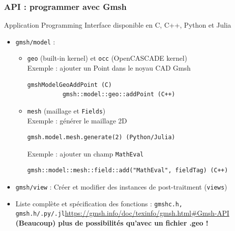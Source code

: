 \documentclass[aspectratio=169]{beamer}
\begin{document}

\begin{frame}[fragile]
\frametitle{API : programmer avec Gmsh}
  Application Programming Interface disponible en C, C++, Python et Julia \\
  \begin{itemize}
    \item \texttt{gmsh/model} :
    \begin{itemize}
      \item \texttt{geo} (built-in kernel) et \texttt{occ} (OpenCASCADE kernel)\\
       Exemple : ajouter un Point dans le noyau CAD Gmsh
        \begin{lstlisting}[frame=none, aboveskip=0mm, belowskip=0mm]
          gmshModelGeoAddPoint (C)
          gmsh::model::geo::addPoint (C++)
        \end{lstlisting}
      \item \texttt{mesh} (maillage et \texttt{Fields})\\
        Exemple : générer le maillage 2D
        \begin{lstlisting}[frame=none, aboveskip=0mm, belowskip=0mm]
          gmsh.model.mesh.generate(2) (Python/Julia)
        \end{lstlisting}
        Exemple : ajouter un champ \texttt{MathEval}
        \begin{lstlisting}[frame=none, aboveskip=0mm, belowskip=0mm]
          gmsh::model::mesh::field::add("MathEval", fieldTag) (C++)
        \end{lstlisting}
    \end{itemize}
    \item \texttt{gmsh/view} : Créer et modifier des instances de post-traitment (\texttt{views})
    \item Liste complète et spécification des fonctions : \texttt{gmshc.h, gmsh.h/.py/.jl}\url{https://gmsh.info/doc/texinfo/gmsh.html#Gmsh-API}\\
    \textbf{(Beaucoup) plus de possibilités qu'avec un fichier .geo !}
  \end{itemize}

\end{frame}
\end{document}
